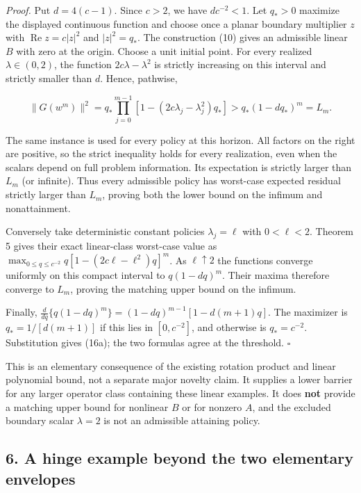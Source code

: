 \documentclass[
  british,
  11pt,
  a4paper,
]{article}
\let\oldsubsection\subsection
\renewcommand{\subsection}{\Needspace{5\baselineskip}\oldsubsection}
\begin{document}
\emph{Proof.} Put \(d=4(c-1)\). Since \(c>2\), we have \(dc^{-2}<1\).
Let \(q_*>0\) maximize the displayed continuous function and choose once
a planar boundary multiplier \(z\) with \(\operatorname{Re}z=c|z|^2\)
and \(|z|^2=q_*\). The construction (10) gives an admissible linear
\(B\) with zero at the origin. Choose a unit initial point. For every
realized \(\lambda\in(0,2)\), the function \(2c\lambda-\lambda^2\) is
strictly increasing on this interval and strictly smaller than \(d\).
Hence, pathwise,

\[
\|G(w^m)\|^2
=q_*\prod_{j=0}^{m-1}[1-(2c\lambda_j-\lambda_j^2)q_*]
>q_*(1-dq_*)^m=L_m.
\]

The same instance is used for every policy at this horizon. All factors
on the right are positive, so the strict inequality holds for every
realization, even when the scalars depend on full problem information.
Its expectation is strictly larger than \(L_m\) (or infinite). Thus
every admissible policy has worst-case expected residual strictly larger
than \(L_m\), proving both the lower bound on the infimum and
nonattainment.

Conversely take deterministic constant policies \(\lambda_j=\ell\) with
\(0<\ell<2\). Theorem 5 gives their exact linear-class worst-case value
as \(\max_{0\leq q\leq c^{-2}}q[1-(2c\ell-\ell^2)q]^m\). As
\(\ell\uparrow2\) the functions converge uniformly on this compact
interval to \(q(1-dq)^m\). Their maxima therefore converge to \(L_m\),
proving the matching upper bound on the infimum.

Finally, \(\frac{d}{dq}\{q(1-dq)^m\}=(1-dq)^{m-1}[1-d(m+1)q]\). The
maximizer is \(q_*=1/[d(m+1)]\) if this lies in \([0,c^{-2}]\), and
otherwise is \(q_*=c^{-2}\). Substitution gives (16a); the two formulas
agree at the threshold. \(\square\)

This is an elementary consequence of the existing rotation product and
linear polynomial bound, not a separate major novelty claim. It supplies
a lower barrier for any larger operator class containing these linear
examples. It does \textbf{not} provide a matching upper bound for
nonlinear \(B\) or for nonzero \(A\), and the excluded boundary scalar
\(\lambda=2\) is not an admissible attaining policy.

\subsection{6. A hinge example beyond the two elementary
envelopes}\label{a-hinge-example-beyond-the-two-elementary-envelopes}
\end{document}
